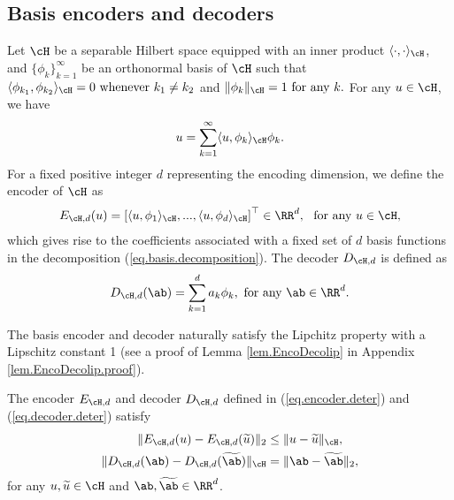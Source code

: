\documentclass[11pt]{article} %
\begin{document}
\subsection{Basis encoders and decoders}
Let $\cH$ be a separable Hilbert space equipped with an inner product $\langle\cdot,\cdot \rangle_{\cH}$, and $\{\phi_k\}_{k=1}^{\infty}$ be an orthonormal basis of $\cH$ such that
$\langle \phi_{k_1},\phi_{k_2}\rangle_{\cH}=0 \mbox{ whenever } k_1\neq k_2$ and $\|\phi_k\|_{\cH}=1 \mbox{ for any } k.$
For any $u\in\cH$, we have
\begin{align}
	u=\sum_{k=1}^{\infty} \langle u,\phi_k\rangle_{\cH} \phi_k.
	\label{eq.basis.decomposition}
\end{align}
For a fixed positive integer $d$ representing the encoding dimension, we define the encoder of $\cH$ as
\begin{align}
	E_{\cH,d}(u)=\left[\langle u,\phi_1\rangle_{\cH},...,\langle u,\phi_d\rangle_{\cH} \right]^{\top} \in \RR^d, \ \text{ for any } u \in \cH,
	\label{eq.encoder.deter}
\end{align}
which gives rise to the coefficients associated with a fixed set of $d$ basis functions in the decomposition (\ref{eq.basis.decomposition}).
The decoder $D_{\cH,d}$ is defined as
\begin{align}
	D_{\cH,d}(\ab)=\sum_{k=1}^d a_k\phi_k, \text{ for any } \ab\in\RR^d.
	\label{eq.decoder.deter}
\end{align}

The basis encoder and decoder naturally satisfy the Lipchitz property with a Lipschitz constant 1 (see a proof of Lemma \ref{lem.EncoDecolip} in Appendix \ref{lem.EncoDecolip.proof}).
\begin{lemma}\label{lem.EncoDecolip}
	The encoder $E_{\cH,d}$ and decoder $D_{\cH,d}$ defined in (\ref{eq.encoder.deter}) and (\ref{eq.decoder.deter}) satisfy
	\begin{align}
		\|E_{\cH,d}(u)-E_{\cH,d}(\widetilde{u})\|_2&\leq \|u-\widetilde{u}\|_{\cH}, \label{eq.deter.encoder.lip}\\
		\|D_{\cH,d}(\ab)- D_{\cH,d}(\widetilde{\ab})\|_{\cH} &= \|\ab-\widetilde{\ab}\|_2,
		\label{eq.deter.decoder.lip}
	\end{align}
for any $u,\widetilde{u}\in \cH$ and $\ab,\widetilde{\ab}\in \RR^d$.
\end{lemma}
\end{document}
